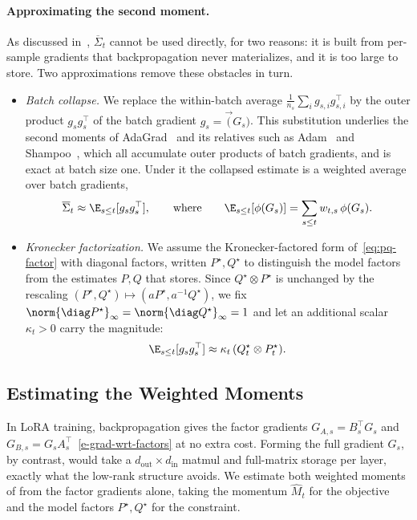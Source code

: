 \paragraph{Approximating the second moment.} As discussed in~,
$\overline\Sigma_t$ cannot be used directly, for two reasons: it is
built from per-sample gradients that backpropagation never
materializes, and it is too large to store. Two approximations remove
these obstacles in turn.
\begin{itemize}[leftmargin=1.5em,itemsep=2pt,topsep=2pt]
  \item \emph{Batch collapse.} We replace the within-batch average
  $\frac1{n_s}\sum_ig_{s,i}g_{s,i}^\top$ by the outer product
  $g_sg_s^\top$ of the batch gradient $g_s=\vec(G_s)$. This substitution
  underlies the second moments of AdaGrad~\cite{adagrad} and its
  relatives such as Adam~\cite{adam} and Shampoo~\cite{shampoo}, which
  all accumulate outer products of batch gradients, and is exact at
  batch size one. Under it the collapsed estimate is a
  weighted average over batch gradients,
  \[
    \overline\Sigma_t\approx\E_{s \leq t}[g_sg_s^\top],
    \qquad\text{where}\qquad
    \E_{s \leq t}[\phi(G_s)]=\sum_{s\le t}w_{t,s}\,\phi(G_s).
  \]
  \item \emph{Kronecker factorization.} We assume the
  Kronecker-factored form of~\eqref{eq:pq-factor} with diagonal
  factors, written $P^\star,Q^\star$ to distinguish the model factors
  from the estimates $P,Q$ that  stores. Since
  $Q^\star\otimes P^\star$ is unchanged by the rescaling
  $(P^\star,Q^\star)\mapsto(aP^\star,a^{-1}Q^\star)$, we fix
  $\norm{\diag P^\star}_\infty=\norm{\diag Q^\star}_\infty=1$ and let an additional scalar
  $\kappa_t>0$ carry the magnitude:
  \begin{equation}\label{e-diag-kron-second-mom-model}
    \E_{s \leq t}[g_sg_s^\top]\approx\kappa_t\,(Q^\star_t\otimes P^\star_t).
  \end{equation}
\end{itemize}

\subsection{Estimating the Weighted Moments}
\label{sec:weighted-estimation}
In LoRA training, backpropagation gives the factor gradients $G_{A,s}=B_s^\top G_s$
and $G_{B,s}=G_sA_s^\top$~\eqref{e-grad-wrt-factors} at no extra cost. Forming
the full gradient $G_s$, by contrast, would take a $d_{\mathrm{out}}\times
d_{\mathrm{in}}$ matmul and full-matrix storage per layer, exactly what
the low-rank structure avoids. We estimate both weighted moments of 
from the factor gradients alone, taking the momentum $\widehat M_t$ for
the objective and the model factors $P^\star,Q^\star$ for the
constraint.

